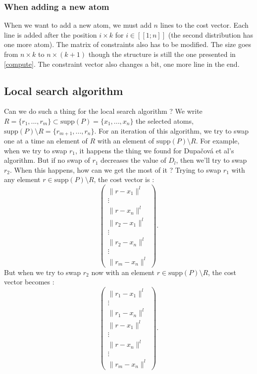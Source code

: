 \documentclass{amsart}
\begin{document}
\subsubsection{When adding a new atom}
When we want to add a new atom, we must add $n$ lines to the cost vector. Each line is added after the position $i\times k$ for $i\in [\![1;n]\!]$ (the second distribution has one more atom). The matrix of constraints also has to be modified. The size goes from $n\times k$ to $n\times \left(k+1\right)$ though the structure is still the one presented in \ref{compute}. The constraint vector also changes a bit, one more line in the end.
\subsection{Local search algorithm}
Can we do such a thing for the local search algorithm ? We write $R=\{r_1,...,r_m\}\subset\text{supp}\left(P\right)=\{x_1,...,x_n\}$ the selected atoms, $\text{supp}\left(P\right)\setminus R =\{r_{m+1},...,r_{n}\}$. For an iteration of this algorithm, we try to swap one at a time an element of $R$ with an element of $\text{supp}\left(P\right)\setminus R$. For example, when we try to swap $r_1$, it happens the thing we found for Dupačová et al's algorithm. But if no swap of $r_1$ decreases the value of $D_l$, then we'll try to swap $r_2$. When this happens, how can we get the most of it ? 
Trying to swap $r_1$ with any element $r\in\text{supp}\left(P\right)\setminus R$, the cost vector is : 
$$
\begin{pmatrix}
    \lVert r-x_1 \rVert^l \\ \vdots \\ \lVert r-x_n \rVert^l \\ \lVert r_2-x_1 \rVert^l\\  \vdots  \\  \lVert r_2-x_n \rVert^l \\ \vdots \\ \lVert r_m-x_n \rVert ^l
\end{pmatrix}.$$
But when we try to swap $r_2$ now with an element $r\in\text{supp}\left(P\right)\setminus R$, the cost vector becomes : 
$$
\begin{pmatrix}
    \lVert r_1-x_1 \rVert^l \\ \vdots \\ \lVert r_1-x_n \rVert^l \\ \lVert r-x_1 \rVert^l\\  \vdots  \\  \lVert r-x_n \rVert^l \\ \vdots \\ \lVert r_m-x_n \rVert ^l
\end{pmatrix}.
$$
\end{document}
